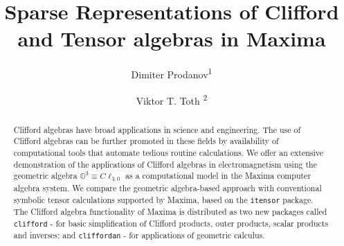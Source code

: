 \documentclass[twoside,reqno,11pt]{amsart}
\theoremstyle{definition}
\theoremstyle{remark}
\numberwithin{equation}{section}
\newcommand{\symb}[1]{{\tt #1}}
\begin{document}
\title[Clifford and Tensor Algebras in Maxima]{Sparse Representations of Clifford and Tensor algebras in Maxima}

\author{Dimiter Prodanov\textsuperscript{1}}

\address{
	Department of Environment, Health and Safety,
	Neuroscience Research Flanders,
	IMEC vzw, Leuven, Belgium
}

\author{Viktor T. Toth \textsuperscript{2}}
\address{Center for Research on Integrated Sensors Platforms
	Carleton University
    Ottawa, Ontario, Canada
}



\newcommand{\Addresses}{{\bigskip
		\footnotesize
		
	 \textsuperscript{1} Department of Environment, Health and Safety,
	 Neuroscience Research Flanders,
	 IMEC vzw, Leuven, Belgium
		
	\medskip
		
	\textsuperscript{2} Center for Research on Integrated Sensors Platforms
	Carleton University
	Ottawa, Ontario, Canada		
	}}
	
\begin{abstract}
Clifford algebras have broad applications in science and engineering. The use of Clifford algebras can be further promoted in these fields by availability of computational tools that automate tedious routine calculations.
We offer an extensive demonstration of the applications of Clifford algebras in electromagnetism using the geometric algebra $\mathbb{G}^3 \equiv C\ell_{3,0}$ as a computational model in the Maxima computer algebra  system.
We compare the geometric algebra-based approach with conventional symbolic tensor calculations supported by Maxima, based on the \symb{itensor} package.
The Clifford algebra functionality of Maxima is distributed as two new packages  called  \symb{clifford} - for basic  simplification of Clifford products, outer products, scalar products and inverses; and \symb{cliffordan} - for applications of geometric calculus.
\end{abstract}

\maketitle
\end{document}
